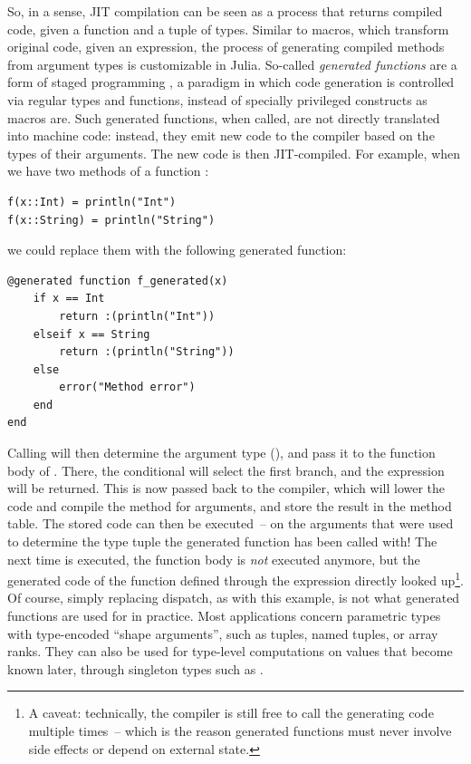 So, in a sense, JIT compilation can be seen as a process that returns compiled code, given a
function and a tuple of types.  Similar to macros, which transform original code, given an
expression, the process of generating compiled methods from argument types is customizable in Julia.
So-called \emph{generated functions} are a form of staged programming
\parencite{rompf2010lightweight,bolewski2015staged}, a paradigm in which code generation is
controlled via regular types and functions, instead of specially privileged constructs as macros
are. Such generated functions, when called, are not directly translated into machine code: instead,
they emit new code to the compiler based on the types of their arguments.  The new code is then
JIT-compiled.  For example, when we have two methods of a function :
\begin{lstlisting}
f(x::Int) = println("Int")
f(x::String) = println("String")
\end{lstlisting}
we could replace them with the following generated function:
\begin{lstlisting}
@generated function f_generated(x)
    if x == Int
        return :(println("Int"))
    elseif x == String
        return :(println("String"))
    else
        error("Method error")
    end
end
\end{lstlisting}
Calling  will then determine the argument type (), and
pass it to the function body of .  There, the conditional will select the first
branch, and the expression  will be returned.  This is now passed back to
the compiler, which will lower the code and compile the method for  arguments, and store
the result in the method table.  The stored code can then be executed~-- on the arguments that were
used to determine the type tuple the generated function has been called with!  The next time
 is executed, the function body is \emph{not} executed anymore, but the generated
code of the function defined through the expression  directly looked
up\footnote{A caveat: technically, the compiler is still free to call the generating code multiple
  times~-- which is the reason generated functions must never involve side effects or depend on
  external state.}.  Of course, simply replacing dispatch, as with this example, is not what
generated functions are used for in practice.  Most applications concern parametric types with
type-encoded \enquote{shape arguments}, such as tuples, named tuples, or array ranks.  They can also
be used for type-level computations on values that become known later, through singleton types such
as .

